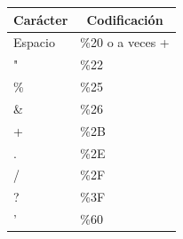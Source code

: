 \documentclass{article}
\begin{document}
	\begin{table}[H]
		\centering
		\begin{tabular}{|l|l|}
			\hline
			\multicolumn{1}{|c|}{\textbf{Carácter}} & \multicolumn{1}{c|}{\textbf{Codificación}} \\ \hline
			Espacio                                 & \%20 o a veces +                           \\ \hline
			"                                       & \%22                                       \\ \hline
			\%                                      & \%25                                       \\ \hline
			\&                                      & \%26                                       \\ \hline
			+                                       & \%2B                                       \\ \hline
			.                                       & \%2E                                       \\ \hline
			/                                       & \%2F                                       \\ \hline
			?                                       & \%3F                                       \\ \hline
			'                                       & \%60                                       \\ \hline
		\end{tabular}
	\end{table}
	
\end{document}
